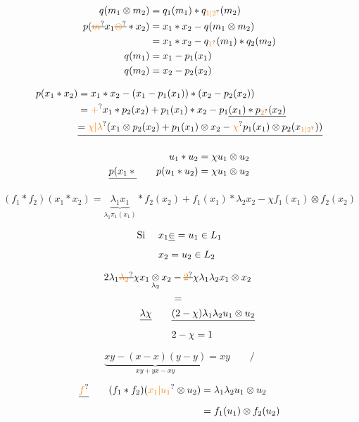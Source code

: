 \[
\begin{aligned}
q(m_1\otimes m_2)&=q_1(m_1)\ast q_{\unsure{1|2}}(m_2)\\
p(\deleted{\unsure{m}}x_1\deleted{\unsure{\otimes}}\ast x_2)&=x_1\ast x_2-q(m_1\otimes m_2)\\
 &=x_1\ast x_2-q_{\unsure{1}}(m_1)\ast q_2(m_2)\\
q(m_1)&=x_1-p_1(x_1)\\
q(m_2)&=x_2-p_2(x_2)
\end{aligned}
\]

\[
\begin{aligned}
p(x_1\ast x_2)&=x_1\ast x_2-(x_1-p_1(x_1))\ast(x_2-p_2(x_2))\\
 &=\unsure{+}x_1\ast p_2(x_2)+p_{1}(x_1)\ast x_2-p_1\underline{(x_1)\ast p_{\unsure{2}}(x_2)}\\
 &\deleted{=\unsure{\chi|\lambda}(x_1\otimes p_2(x_2)+p_1(x_1)\otimes x_2-\unsure{\chi}p_1(x_1)\otimes p_2(x_{\unsure{1|2}}))}
\end{aligned}
\]

\[
\begin{aligned}
u_1\ast u_2&=\chi u_1\otimes u_2\\
\deleted{p(x_1\ast{}}\qquad p(u_1\ast u_2)&=\chi u_1\otimes u_2
\end{aligned}
\]

\[
\boxed{(f_1\ast f_2)(x_1\ast x_2)=
\underbrace{\lambda_1x_1}_{\lambda_1\pi_1(x_1)}\ast f_2(x_2)
+f_1(x_1)\ast\lambda_2 x_2-\chi f_1(x_1)\otimes f_2(x_2)}
\]


\[
\begin{aligned}
\text{Si }\quad x_1&\deleted{\in}=u_1\in L_1\\
x_2&=u_2\in L_2
\end{aligned}
\]

\[
\begin{aligned}
2\lambda_1\deleted{\unsure{\lambda_2}}\chi x_1\mathop{\otimes}_{\lambda_2}x_2
 &-\deleted{\unsure{2}}\chi\lambda_1\lambda_2 x_1\otimes x_2\\
 &=\\
\deleted{\lambda\chi}\qquad&\deleted{(2-\chi)\lambda_1\lambda_2 u_1\otimes u_2}\\
&2-\chi=1
\end{aligned}
\]

\[
\underbrace{xy-(x-x)(y-y)}_{xy+yx-xy}=xy\qquad\Big/
\]

\[
\begin{aligned}
\deleted{\unsure{f}}\qquad (f_1\ast f_2)(\unsure{x_1|u_1}\otimes u_2)&=\lambda_1\lambda_2 u_1\otimes u_2\\
 &=f_1(u_1)\otimes f_2(u_2)
\end{aligned}
\]

